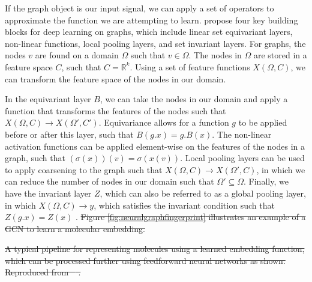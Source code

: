 \documentclass[journal=jcisd8,manuscript=article]{achemso} %
\providecommand{\DIFdel}[1]{{\protect\color{red}\sout{#1}}}                      %
\providecommand{\DIFaddbegin}{} %
\providecommand{\DIFdelbegin}{} %
\providecommand{\DIFdelend}{} %
\providecommand{\DIFdelFL}[1]{\DIFdel{#1}} %
\begin{document}
If the graph object is our input signal, we can apply a set of operators to approximate the function we are attempting to learn. \citet{bronstein2021geometric} propose four key building blocks for deep learning on graphs, which include linear set equivariant layers, non-linear functions, local pooling layers, and set invariant layers. For graphs, the nodes $v$ are found on a domain $\Omega$ such that $v \in \Omega$. The nodes in $\Omega$ are stored in a feature space $C$, such that $C = \mathbb{R}^k$. Using a set of feature functions $X(\Omega, C)$, we can transform the feature space of the nodes in our domain. 

In the equivariant layer $B$, we can take the nodes in our domain and apply a function that transforms the features of the nodes such that $X(\Omega, C) \rightarrow X(\Omega', C')$. Equivariance allows for a function $g$ to be applied before or after this layer, such that $B(g.x) = g.B(x)$. The non-linear activation functions can be applied element-wise on the features of the nodes in a graph, such that $(\sigma(x))(v) = \sigma(x(v))$. Local pooling layers can be used to apply coarsening to the graph such that $X(\Omega, C) \rightarrow X(\Omega', C)$, in which we can reduce the number of nodes in our domain such that $\Omega' \subseteq \Omega$. Finally, we have the invariant layer $Z$, which can also be referred to as a global pooling layer, in which $X(\Omega, C) \rightarrow y$, which satisfies the invariant condition such that $Z(g.x) = Z(x)$ \citep{bronstein2021geometric}. 
\DIFdelbegin \DIFdel{Figure \ref{fig:neuralgraphfingerprint} illustrates an example of a GCN to learn a molecular embedding.
}\DIFdelend 

\DIFdelbegin %
{%
\DIFdelFL{A typical pipeline for representing molecules using a learned embedding function, which can be processed further using feedforward neural networks as shown. Reproduced from \mbox{%
\citet{jiang2021could}}\hspace{0pt}%
.}}
\DIFdelend %
\DIFaddbegin 
\end{document}
